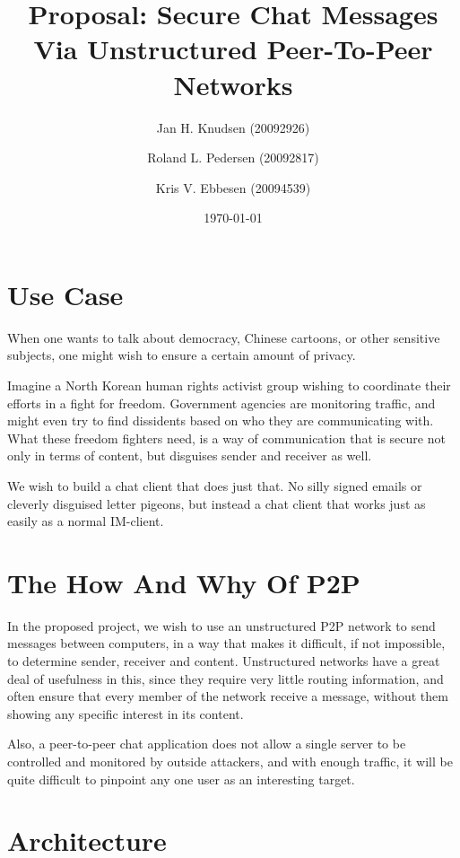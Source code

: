 \documentclass{article}
\begin{document}
\title{Proposal: Secure Chat Messages Via Unstructured Peer-To-Peer Networks}
\date{\today}
\author{Jan H. Knudsen (20092926)
\and
Roland L. Pedersen (20092817)
\and
Kris V. Ebbesen (20094539)
}
\maketitle

\section{Use Case}

When one wants to talk about democracy, Chinese cartoons, or other sensitive subjects, one might wish to ensure a certain amount of privacy.

Imagine a North Korean human rights activist group wishing to coordinate their efforts in a fight for freedom. Government agencies are monitoring traffic, and might even try to find dissidents based on who they are communicating with. What these freedom fighters need, is a way of communication that is secure not only in terms of content, but disguises sender and receiver as well.

We wish to build a chat client that does just that. No silly signed emails or cleverly disguised letter pigeons, but instead a chat client that works just as easily as a normal IM-client.

\section{The How And Why Of P2P}

In the proposed project, we wish to use an unstructured P2P network to send messages between computers, in a way that makes it difficult, if not impossible, to determine sender, receiver and content. Unstructured networks have a great deal of usefulness in this, since they require very little routing information, and often ensure that every member of the network receive a message, without them showing any specific interest in its content.

Also, a peer-to-peer chat application does not allow a single server to be controlled and monitored by outside attackers, and with enough traffic, it will be quite difficult to pinpoint any one user as an interesting target.

\section{Architecture}
\end{document}
